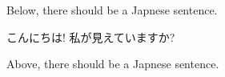 \documentclass[uplatex]{jsarticle}
\begin{document}
Below, there should be a Japnese sentence.

こんにちは! 私が見えていますか? 

Above, there should be a Japnese sentence.
\end{document}
